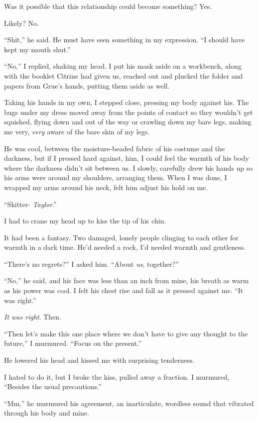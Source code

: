 Was it possible that this relationship could become something?  Yes.



Likely?  No.



``Shit,'' he said.  He must have seen something in my expression.  ``I should have kept my mouth shut.''



``No,'' I replied, shaking my head.  I put his mask aside on a workbench, along with the booklet Citrine had given us, reached out and plucked the folder and papers from Grue's hands, putting them aside as well.



Taking his hands in my own, I stepped close, pressing my body against his.  The bugs under my dress moved away from the points of contact so they wouldn't get squished, flying down and out of the way or crawling down my bare legs, making me very, \emph{very }aware of the bare skin of my legs.



He was cool, between the moisture-beaded fabric of his costume and the darkness, but if I pressed hard against, him, I could feel the warmth of his body where the darkness didn't sit between us.  I slowly, carefully drew his hands up so his arms were around my shoulders, arranging them.  When I was done, I wrapped my arms around his neck, felt him adjust his hold on me.



``Skitter- \emph{Taylor}.''



I had to crane my head up to kiss the tip of his chin.



It had been a fantasy.  Two damaged, lonely people clinging to each other for warmth in a dark time.  He'd needed a rock, I'd needed warmth and gentleness.



``There's no regrets?'' I asked him.  ``About \emph{us}, together?''



``No,'' he said, and his face was less than an inch from mine, his breath as warm as his power was cool.  I felt his chest rise and fall as it pressed against me.  ``It was right.''



\emph{It was right}.  Then.



``Then let's make this one place where we don't have to give any thought to the future,'' I murmured.  ``Focus on the present.''



He lowered his head and kissed me with surprising tenderness.



I hated to do it, but I broke the kiss, pulled away a fraction.  I murmured, ``Besides the usual precautions.''



``Mm,'' he murmured his agreement, an inarticulate, wordless sound that vibrated through his body and mine.





